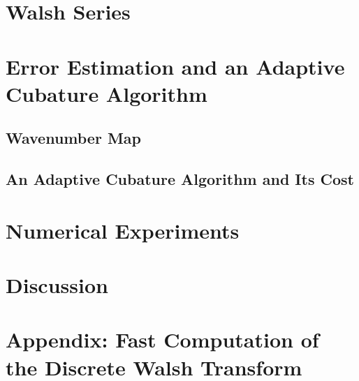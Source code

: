 \documentclass[graybox,footinfo]{svmult}
\begin{document}
\section{Walsh Series} \label{WaveWalshsec}

\section{Error Estimation and an Adaptive Cubature Algorithm} \label{ErrEstsec}

\subsection{Wavenumber Map} \label{wavenummapsec}

\subsection{An Adaptive Cubature Algorithm and Its Cost}

\section{Numerical Experiments} \label{numexpsec}


\section{Discussion}


\begin{acknowledgement}
\end{acknowledgement}




\section*{Appendix:  Fast Computation of the Discrete Walsh Transform}
\end{document}
